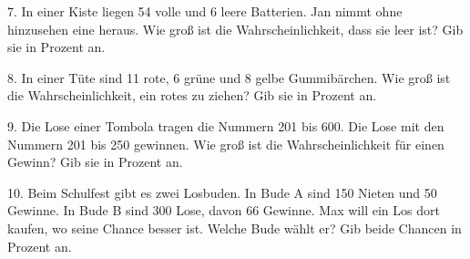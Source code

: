 \documentclass[11pt]{article}
\begin{document}
\begin{pfaufg}{}{7.}{}
In einer Kiste liegen 54 volle und 6 leere Batterien. Jan nimmt ohne hinzusehen eine heraus. Wie groß ist die Wahrscheinlichkeit, dass sie leer ist? Gib sie in Prozent an.
\end{pfaufg}

\begin{pfaufg}{}{8.}{}
In einer Tüte sind 11 rote, 6 grüne und 8 gelbe Gummibärchen. Wie groß ist die Wahrscheinlichkeit, ein rotes zu ziehen? Gib sie in Prozent an.
\end{pfaufg}

\begin{pfaufg}{}{9.}{}
Die Lose einer Tombola tragen die Nummern 201 bis 600. Die Lose mit den Nummern 201 bis 250 gewinnen. Wie groß ist die Wahrscheinlichkeit für einen Gewinn? Gib sie in Prozent an.
\end{pfaufg}

\begin{pfaufg}{}{10.}{}
Beim Schulfest gibt es zwei Losbuden. In Bude A sind 150 Nieten und 50 Gewinne. In Bude B sind 300 Lose, davon 66 Gewinne. Max will ein Los dort kaufen, wo seine Chance besser ist. Welche Bude wählt er? Gib beide Chancen in Prozent an.
\end{pfaufg}
\end{document}
